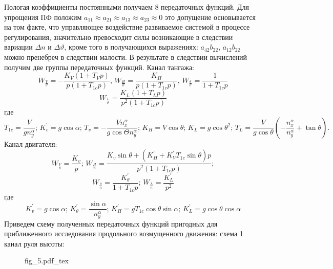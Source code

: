 \documentclass{article}
\begin{document}
Пологая коэффициенты постоянными получаем 8 передаточных функций. Для упрощения ПФ положим $a_{11} \approx a_{21} \approx a_{13} \approx a_{23} \approx 0$ это допущение основывается на том факте,
что управляющее воздействие развиваемое системой в процессе регулирования, значительно превосходит силы возникающие в следствии вариации $\Delta n$ и $\Delta \vartheta$, кроме того в получающихся выражениях:
$a_{42} b_{22}, \, a_{12} b_{22}$ можно пренебреч в следствии малости.
В результате в следствии вычислений получим две группы передаточных функций.
Канал тангажа:\\
\[
	W_{\frac{V}{\vartheta}} = -\frac{K_V(1+T_Vp)}{p(1+T_{1c}p)}, \, W_{\frac{H}{\vartheta}} = \frac{K_H}{p(1+T_{1c}p)}, \, W_{\frac{\theta}{\vartheta}} = \frac{1}{1+T_{1c}p}
\]
\[
	W_{\frac{L}{\vartheta}} = \frac{K_L(1+T_Lp)}{p^2(1+T_{1c}p)}
\]
где\\
\[
	T_{1c} = \frac{V}{g n_y^\alpha}; \, K_v^{'} = g\cos{\alpha}; \, T_v = -\frac{V n_x^\alpha}{g \cos{\Theta} n_y^\alpha};\, K_H = V \cos{\theta}; \, K_L = g \cos{\theta}^2 ;\, T_L= \frac{V}{g \cos{\theta}} (- \frac{n_x^\alpha}{n_y^\alpha} + \tan{\theta}).
\]
Канал двигателя:\\
\[
	W_{\frac{V}{n}} = \frac{K_v}{p};\, W_{\frac{H}{n}} = \frac{K_v \sin{\theta} + (K_H^{'} + K_V^{'} T_{1c} \sin{\theta})p}{p^2(1+T_{1c}p)};
\]
\[
	W_{\frac{\theta}{n}} = \frac{K_\theta^{'}}{1+T_{1c}p}; \, W_{\frac{L}{n}} = \frac{K_L^{'}}{p^2} 
\]
где \\
\[
	K_v^{'} = g\cos{\alpha}; \, K_\theta^{'} = \frac{\sin{\alpha}}{n_y^\alpha}; \, K_H^{'} = gT_{1c} \cos{\theta}\sin{\alpha};\, K_L^{'} = g\cos{\theta} \cos{\alpha}
\]
Приведем схему полученных передаточных функций пригодных для приближенного исследования продольного возмущенного движения:
схема 1 канал руля высоты:
\begin{figure}[ht]
	{fig_5.pdf_tex}
\end{figure}
\end{document}
